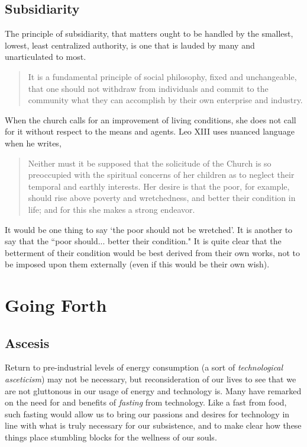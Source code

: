 \documentclass[letterpaper]{article}
\begin{document}
\subsection{Subsidiarity}

The principle of subsidiarity, that matters ought to be handled by the smallest, lowest, least centralized authority, is one that is lauded by many and unarticulated to most.

\begin{quote}
  It is a fundamental principle of social philosophy, fixed and unchangeable, that one should not withdraw from individuals and commit to the community what they can accomplish by their own enterprise and industry.
\end{quote}

When the church calls for an improvement of living conditions, she does not call for it without respect to the means and agents. Leo XIII uses nuanced language when he writes,

\begin{quote}
  Neither must it be supposed that the solicitude of the Church is so preoccupied with the spiritual concerns of her children as to neglect their temporal and earthly interests. Her desire is that the poor, for example, should rise above poverty and wretchedness, and better their condition in life; and for this she makes a strong endeavor.
\end{quote}

It would be one thing to say `the poor should not be wretched'. It is another to say that the ``poor should... better their condition."  It is quite clear that the betterment of their condition would be best derived from their own works, not to be imposed upon them externally (even if this would be their own wish).


\section{Going Forth}




\iffalse
\subsection{Ascesis}

Return to pre-industrial levels of energy consumption (a sort of \textit{technological asceticism}) may not be necessary, but reconsideration of our lives to see that we are not gluttonous in our usage of energy and technology is. Many have remarked on the need for and benefits of \textit{fasting} from technology. Like a fast from food, such fasting would allow us to bring our passions and desires for technology in line with what is truly necessary for our subsistence, and to make clear how these things place stumbling blocks for the wellness of our souls. 
\end{document}
